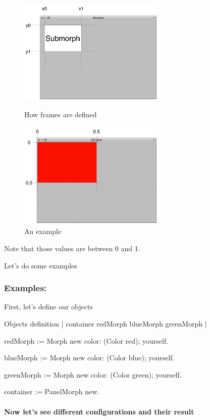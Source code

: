 \documentclass[a4paper,10pt,twoside]{book}
\begin{document}
\begin{figure}[ht]\centering
	\includegraphics[width=7cm]{DefaultFrame}
	\caption{How frames are defined}
	\label{fig:defaultFrame}
	\includegraphics[width=7cm]{FrameExplanation}
	\caption{An example}
	\label{fig:frameExplanation}
\end{figure}

Note that those values are between 0 and 1.


Let's do some examples

\subsubsection{Examples:}

First, let's define our objects
\begin{code}{Objects definition}
| container redMorph blueMorph greenMorph |

redMorph := Morph new 
				color: (Color red);
				yourself.
				
blueMorph := Morph new 
				color: (Color blue);
				yourself.
				
greenMorph := Morph new 
				color: (Color green);
				yourself.
				
container := PanelMorph new.
\end{code}

\paragraph{Now let's see different configurations and their result}
\end{document}
